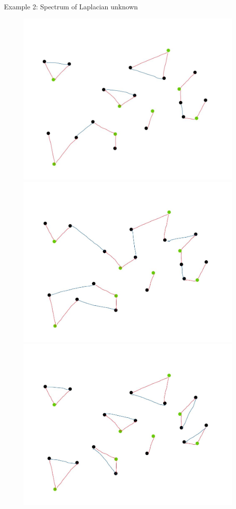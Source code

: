 \documentclass{beamer}
\begin{document}
\begin{frame}{Example 2: Spectrum of Laplacian unknown}
\begin{figure}[]
\begin{overprint}
			\includegraphics[scale=0.65]{figures/graph_example_2.jpg}	
			\onslide<4>\includegraphics[scale=0.65]{figures/graph_example_3.jpg}
			\onslide<5>\includegraphics[scale=0.65]{figures/graph_example_4.jpg}	

\end{overprint}
\end{figure}
\end{frame}
\end{document}
